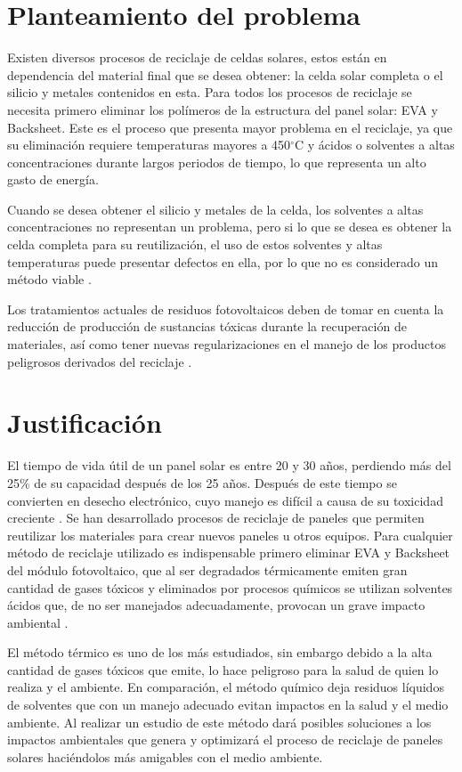 \section{Planteamiento del problema}
\label{sec:Planteamiento del problema}
Existen diversos procesos de reciclaje de celdas solares, estos están en dependencia del material final que se desea obtener: la celda solar completa o el silicio y metales contenidos en esta. Para todos los procesos de reciclaje se necesita primero eliminar los polímeros de la estructura del panel solar: EVA y Backsheet. Este es el proceso que presenta mayor problema en el reciclaje, ya que su eliminación requiere temperaturas  mayores a 450$^{\circ}$C y ácidos o solventes a altas concentraciones durante largos periodos de tiempo, lo que representa un alto gasto de energía. 

Cuando se desea obtener el silicio y metales de la celda,  los solventes a altas concentraciones no representan un problema, pero si lo que se desea es obtener la celda completa para su reutilización, el uso de estos solventes y altas temperaturas puede presentar defectos en ella, por lo que no es considerado un método viable \citep{Kim2012}.

Los tratamientos actuales de residuos fotovoltaicos deben de tomar en cuenta la reducción de producción de sustancias tóxicas durante la recuperación de materiales, así como tener nuevas regularizaciones en el manejo de los productos peligrosos derivados del reciclaje \citep{Fiandra2019}. 

\section{Justificación}
\label{sec:Justificación}
El tiempo de vida útil de un panel solar es entre 20 y 30 años, perdiendo más del 25\% de su capacidad después de los 25 años. Después de este tiempo se convierten en desecho electrónico, cuyo manejo es difícil a causa de su toxicidad creciente \citep{Doi2001}. Se han desarrollado procesos de reciclaje de paneles que permiten reutilizar los materiales para crear nuevos paneles u otros equipos. Para cualquier método de reciclaje utilizado es indispensable primero eliminar  EVA y Backsheet del módulo fotovoltaico, que al ser degradados térmicamente emiten gran cantidad de gases tóxicos y eliminados por procesos químicos se utilizan solventes ácidos que, de no ser manejados adecuadamente, provocan un grave impacto ambiental \citep{Fiandra2019}.

El método térmico es uno de los más estudiados, sin embargo debido a la alta cantidad de gases tóxicos que emite, lo hace peligroso para la salud de quien lo realiza y el ambiente. En comparación, el método químico deja residuos líquidos de solventes que con un manejo adecuado evitan impactos en la salud y el medio ambiente. Al realizar un estudio de este método dará posibles soluciones a los impactos ambientales que genera y optimizará el proceso de reciclaje de paneles solares haciéndolos más amigables con el medio ambiente. 

